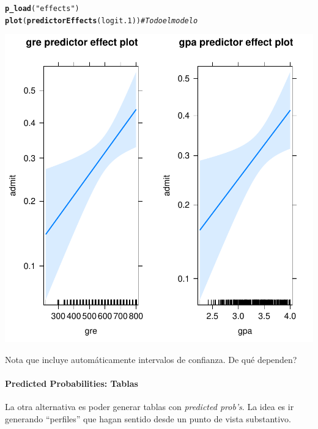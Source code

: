 \documentclass[onesided]{article}\usepackage[]{graphicx}\usepackage[]{color}
\makeatletter
\def\maxwidth{ %
  \ifdim\Gin@nat@width>\linewidth
    \linewidth
  \else
    \Gin@nat@width
  \fi
}
\newcommand{\hlstr}[1]{\textcolor[rgb]{0.192,0.494,0.8}{#1}}%
\newcommand{\hlcom}[1]{\textcolor[rgb]{0.678,0.584,0.686}{\textit{#1}}}%
\newcommand{\hlstd}[1]{\textcolor[rgb]{0.345,0.345,0.345}{#1}}%
\newcommand{\hlkwd}[1]{\textcolor[rgb]{0.737,0.353,0.396}{\textbf{#1}}}%
\newenvironment{kframe}{%
 \def\at@end@of@kframe{}%
 \ifinner\ifhmode%
  \def\at@end@of@kframe{\end{minipage}}%
  \begin{minipage}{\columnwidth}%
 \fi\fi%
 \def\FrameCommand##1{\hskip\@totalleftmargin \hskip-\fboxsep
 \colorbox{shadecolor}{##1}\hskip-\fboxsep
     \hskip-\linewidth \hskip-\@totalleftmargin \hskip\columnwidth}%
 \MakeFramed {\advance\hsize-\width
   \@totalleftmargin\z@ \linewidth\hsize
   \@setminipage}}%
 {\par\unskip\endMakeFramed%
 \at@end@of@kframe}
\newenvironment{knitrout}{}{} %
\makeatother
\begin{document}
\begin{knitrout}
\color{fgcolor}\begin{kframe}
\begin{alltt}
\hlkwd{p_load}\hlstd{(}\hlstr{"effects"}\hlstd{)}
\hlkwd{plot}\hlstd{(}\hlkwd{predictorEffects}\hlstd{(logit.1))} \hlcom{# Todo el modelo }
\end{alltt}
\end{kframe}

{\centering \includegraphics[width=\maxwidth]{figure/predict:2-1} 

}



\end{knitrout}

Nota que incluye autom\'aticamente intervalos de confianza. {\color{red}De qu\'e dependen?}

\paragraph{Predicted Probabilities: Tablas}

La otra alternativa es poder generar tablas con \emph{predicted prob's}. La idea es ir generando ``perfiles'' que hagan sentido desde un punto de vista substantivo. 
\end{document}
